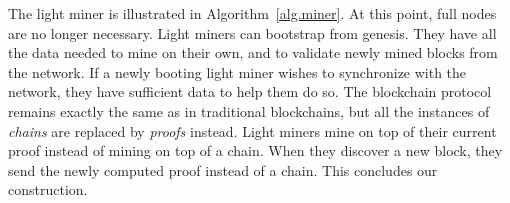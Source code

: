 The light miner is illustrated in Algorithm~\ref{alg.miner}.
At this point, full nodes are no longer necessary. Light miners
can bootstrap from genesis. They have all the data needed to mine on their
own, and to validate newly mined blocks from the network. If a newly booting
light miner wishes to synchronize with the network, they have sufficient
data to help them do so. The blockchain protocol remains exactly the same
as in traditional blockchains, but all the instances of \emph{chains} are
replaced by \emph{proofs} instead. Light miners mine on top of their current
proof instead of mining on top of a chain. When they discover a new block,
they send the newly computed proof instead of a chain.
This concludes our construction.
